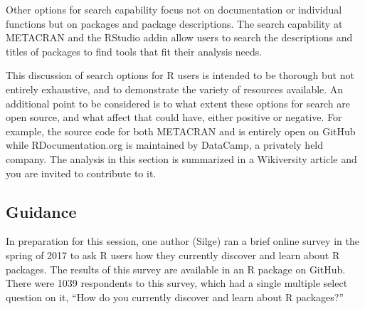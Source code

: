 Other options for search capability focus not on documentation or
individual functions but on packages and package descriptions. The
search capability at METACRAN \citep{metacran} and the RStudio addin
 allow users to search the descriptions and titles
of packages to find tools that fit their analysis needs.

This discussion of search options for R users is intended to be thorough
but not entirely exhaustive, and to demonstrate the variety of resources
available. An additional point to be considered is to what extent these
options for search are open source, and what affect that could have,
either positive or negative. For example, the source code for both
METACRAN \citep{metacran} and  is entirely open on
GitHub while RDocumentation.org is maintained by DataCamp, a privately
held company. The analysis in this section is summarized in a
Wikiversity article \citep{wikiversity} and you are invited to
contribute to it.

\hypertarget{guidance}{%
\subsection{Guidance}\label{guidance}}

In preparation for this session, one author (Silge) ran a brief online
survey in the spring of 2017 to ask R users how they currently discover
and learn about R packages. The results of this survey are available in
an R package  \citep{packagesurvey} on GitHub. There
were 1039 respondents to this survey, which had a single multiple select
question on it, ``How do you currently discover and learn about R
packages?''

